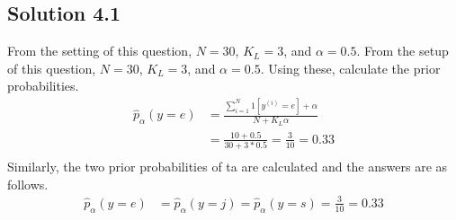 \documentclass[a4paper]{article}
\theoremstyle{definition}
\newenvironment{soln}{
	\leavevmode\color{blue}\ignorespaces
}{}
\begin{document}
	\subsection*{Solution 4.1}	
	\begin{soln}
	From the setting of this question, $N = 30$, $K_L = 3$, and $\alpha = 0.5$. From the setup of this question, $N = 30$, $K_L = 3$, and $\alpha = 0.5$. Using these, calculate the prior probabilities.
		\begin{equation*}\label{xx}
			\begin{split}
				\hat{p}_{\alpha}(y = e) &= \frac{\sum_{i=1}^{N} 1[y^{(i)} = e] + \alpha }{N + K_L \alpha} \\ 
				&= \frac{10 + 0.5}{30 + 3*0.5} = \frac{3}{10} = 0.33 \\
			\end{split}
		\end{equation*}	
		Similarly, the two prior probabilities of ta are calculated and the answers are as follows.
		\begin{equation*}\label{xx}
			\begin{split}
				\hat{p}_{\alpha}(y = e) &= 	\hat{p}_{\alpha}(y = j) = \hat{p}_{\alpha}(y = s) =  \frac{3}{10} = 0.33 \\
			\end{split}
		\end{equation*}	
		
	\end{soln}
	
	\clearpage
\end{document}

